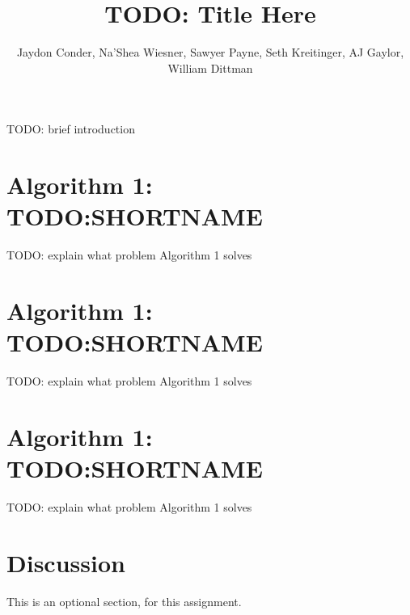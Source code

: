 \documentclass[11pt]{article}
\title{TODO: Title Here}
\author{Jaydon Conder, Na’Shea Wiesner, Sawyer Payne, Seth Kreitinger, AJ Gaylor, William Dittman}
\begin{document}
\maketitle

TODO: brief introduction

\section{Algorithm 1: TODO:SHORTNAME}
TODO: explain what problem Algorithm 1 solves

\section{Algorithm 1: TODO:SHORTNAME}
TODO: explain what problem Algorithm 1 solves

\section{Algorithm 1: TODO:SHORTNAME}
TODO: explain what problem Algorithm 1 solves

\section{Discussion}
This is an optional section, for this assignment.
\end{document}
